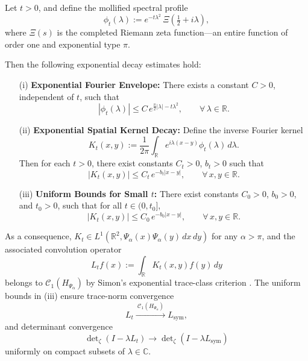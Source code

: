 \begin{lemma}
\label{lem:decay_mollified_kernel}
Let \( t > 0 \), and define the mollified spectral profile
\[
\phi_t(\lambda) := e^{-t\lambda^2} \, \Xi\left(\tfrac{1}{2} + i\lambda\right),
\]
where \( \Xi(s) \) is the completed Riemann zeta function—an entire function of order one and exponential type \( \pi \).

Then the following exponential decay estimates hold:

\begin{enumerate}
    \item[\textup{(i)}] \textbf{Exponential Fourier Envelope:} There exists a constant \( C > 0 \), independent of \( t \), such that
    \[
    |\phi_t(\lambda)| \le C \, e^{\frac{\pi}{2}|\lambda| - t\lambda^2}, \qquad \forall\, \lambda \in \mathbb{R}.
    \]

    \item[\textup{(ii)}] \textbf{Exponential Spatial Kernel Decay:} Define the inverse Fourier kernel
    \[
    K_t(x,y) := \frac{1}{2\pi} \int_{\mathbb{R}} e^{i\lambda(x - y)} \phi_t(\lambda)\,d\lambda.
    \]
    Then for each \( t > 0 \), there exist constants \( C_t > 0 \), \( b_t > 0 \) such that
    \[
    |K_t(x,y)| \le C_t\, e^{-b_t |x - y|}, \qquad \forall\, x, y \in \mathbb{R}.
    \]

    \item[\textup{(iii)}] \textbf{Uniform Bounds for Small \( t \):} There exist constants \( C_0 > 0 \), \( b_0 > 0 \), and \( t_0 > 0 \), such that for all \( t \in (0, t_0] \),
    \[
    |K_t(x,y)| \le C_0\, e^{-b_0 |x - y|}, \qquad \forall\, x, y \in \mathbb{R}.
    \]
\end{enumerate}

\noindent
As a consequence, \( K_t \in L^1(\mathbb{R}^2, \Psi_\alpha(x)\Psi_\alpha(y)\, dx\,dy) \) for any \( \alpha > \pi \), and the associated convolution operator
\[
L_t f(x) := \int_{\mathbb{R}} K_t(x,y) f(y)\, dy
\]
belongs to \( \mathcal{C}_1(H_{\Psi_\alpha}) \) by Simon's exponential trace-class criterion \cite[Thm.~4.2]{Simon2005TraceIdeals}. The uniform bounds in \textup{(iii)} ensure trace-norm convergence
\[
L_t \xrightarrow{\ \mathcal{C}_1(H_{\Psi_\alpha})\ } L_{\mathrm{sym}},
\]
and determinant convergence
\[
\det\nolimits_\zeta(I - \lambda L_t) \to \det\nolimits_\zeta(I - \lambda L_{\mathrm{sym}})
\]
uniformly on compact subsets of \( \lambda \in \mathbb{C} \).
\end{lemma}

